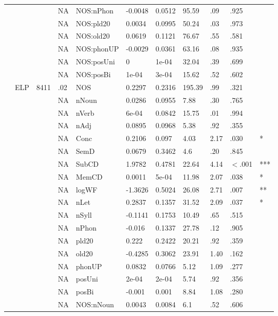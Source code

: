 \begin{table}[ht]
\begin{tabular}{lllllllllll}
   &  &  & NA & NOS:nPhon & -0.0048 & 0.0512 & 95.59 & .09 & .925 &   \\ 
   &  &  & NA & NOS:pld20 & 0.0034 & 0.0995 & 50.24 & .03 & .973 &   \\ 
   &  &  & NA & NOS:old20 & 0.0619 & 0.1121 & 76.67 & .55 & .581 &   \\ 
   &  &  & NA & NOS:phonUP & -0.0029 & 0.0361 & 63.16 & .08 & .935 &   \\ 
   &  &  & NA & NOS:posUni & 0 & 1e-04 & 32.04 & .39 & .699 &   \\ 
   &  &  & NA & NOS:posBi & 1e-04 & 3e-04 & 15.62 & .52 & .602 &   \\ 
   & ELP & 8411 & .02 & NOS & 0.2297 & 0.2316 & 195.39 & .99 & .321 &   \\ 
   &  &  & NA & nNoun & 0.0286 & 0.0955 & 7.88 & .30 & .765 &   \\ 
   &  &  & NA & nVerb & 6e-04 & 0.0842 & 15.75 & .01 & .994 &   \\ 
   &  &  & NA & nAdj & 0.0895 & 0.0968 & 5.38 & .92 & .355 &   \\ 
   &  &  & NA & Conc & 0.2106 & 0.097 & 4.03 & 2.17 & .030 & * \\ 
   &  &  & NA & SemD & 0.0679 & 0.3462 & 4.6 & .20 & .845 &   \\ 
   &  &  & NA & SubCD & 1.9782 & 0.4781 & 22.64 & 4.14 & $<$.001 & *** \\ 
   &  &  & NA & MemCD & 0.0011 & 5e-04 & 11.98 & 2.07 & .038 & * \\ 
   &  &  & NA & logWF & -1.3626 & 0.5024 & 26.08 & 2.71 & .007 & ** \\ 
   &  &  & NA & nLet & 0.2837 & 0.1357 & 31.52 & 2.09 & .037 & * \\ 
   &  &  & NA & nSyll & -0.1141 & 0.1753 & 10.49 & .65 & .515 &   \\ 
   &  &  & NA & nPhon & -0.016 & 0.1337 & 27.78 & .12 & .905 &   \\ 
   &  &  & NA & pld20 & 0.222 & 0.2422 & 20.21 & .92 & .359 &   \\ 
   &  &  & NA & old20 & -0.4285 & 0.3062 & 23.91 & 1.40 & .162 &   \\ 
   &  &  & NA & phonUP & 0.0832 & 0.0766 & 5.12 & 1.09 & .277 &   \\ 
   &  &  & NA & posUni & 2e-04 & 2e-04 & 5.74 & .92 & .356 &   \\ 
   &  &  & NA & posBi & -0.001 & 0.001 & 8.84 & 1.08 & .280 &   \\ 
   &  &  & NA & NOS:nNoun & 0.0043 & 0.0084 & 6.1 & .52 & .606 &   \\ 

\end{tabular}
\end{table}
